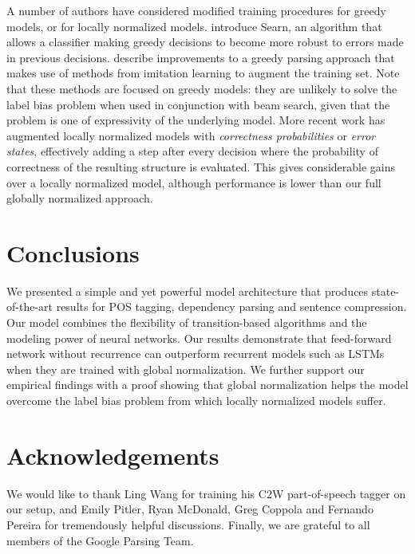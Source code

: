 \documentclass[11pt]{article}
\begin{document}
A number of authors have considered modified training procedures for
greedy models, or for locally normalized models.
 introduce Searn, an algorithm that allows a
classifier making greedy decisions to become more robust to errors
made in previous decisions.  describe
improvements to a greedy parsing approach that makes use of methods
from imitation learning \cite{bagnell2011imitation} to augment the
training set. Note that these methods are focused on greedy
models: they are unlikely to solve the label bias problem when used in
conjunction with beam search, given that the problem is one of
expressivity of the underlying model. More recent work
\cite{henderson2015,vaswani2016} has augmented locally normalized
models with {\em correctness probabilities} or {\em error states},
effectively adding a step after every decision where the probability
of correctness of the resulting structure is evaluated. This gives
considerable gains over a locally normalized model, although
performance is lower than our full globally normalized approach.
 \section{Conclusions}

We presented a simple and yet powerful model architecture
that produces state-of-the-art results for POS tagging,
dependency parsing and sentence compression.
Our model combines the flexibility of transition-based algorithms and
the modeling power of neural networks.
Our results demonstrate that feed-forward network without
recurrence can outperform recurrent models such as LSTMs
when they are trained with global normalization.
We further support our empirical findings 
with a proof showing that global normalization
helps the model overcome the label bias problem
from which locally normalized models suffer.
 
\ifaclfinal
\section*{Acknowledgements}

We would like to thank Ling Wang for training his C2W part-of-speech tagger on our setup,
and Emily Pitler, Ryan McDonald, Greg Coppola and
Fernando Pereira for tremendously helpful discussions.
Finally, we are grateful to all members of the Google Parsing Team.
\else\fi

\balance


\end{document}

